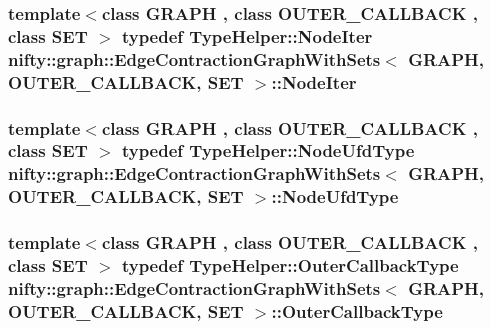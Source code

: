 \subsubsection[{Node\+Iter}]{\setlength{\rightskip}{0pt plus 5cm}template$<$class G\+R\+A\+P\+H , class O\+U\+T\+E\+R\+\_\+\+C\+A\+L\+L\+B\+A\+C\+K , class S\+E\+T $>$ typedef {\bf Type\+Helper\+::\+Node\+Iter} {\bf nifty\+::graph\+::\+Edge\+Contraction\+Graph\+With\+Sets}$<$ G\+R\+A\+P\+H, O\+U\+T\+E\+R\+\_\+\+C\+A\+L\+L\+B\+A\+C\+K, S\+E\+T $>$\+::{\bf Node\+Iter}}\label{classnifty_1_1graph_1_1EdgeContractionGraphWithSets_af9e889455b883d034bf708a0b5b05bee}
\hypertarget{classnifty_1_1graph_1_1EdgeContractionGraphWithSets_ae340ffb867bc1eb19b139e879174607e}{}
\subsubsection[{Node\+Ufd\+Type}]{\setlength{\rightskip}{0pt plus 5cm}template$<$class G\+R\+A\+P\+H , class O\+U\+T\+E\+R\+\_\+\+C\+A\+L\+L\+B\+A\+C\+K , class S\+E\+T $>$ typedef {\bf Type\+Helper\+::\+Node\+Ufd\+Type} {\bf nifty\+::graph\+::\+Edge\+Contraction\+Graph\+With\+Sets}$<$ G\+R\+A\+P\+H, O\+U\+T\+E\+R\+\_\+\+C\+A\+L\+L\+B\+A\+C\+K, S\+E\+T $>$\+::{\bf Node\+Ufd\+Type}}\label{classnifty_1_1graph_1_1EdgeContractionGraphWithSets_ae340ffb867bc1eb19b139e879174607e}
\hypertarget{classnifty_1_1graph_1_1EdgeContractionGraphWithSets_a2f741cfabfa1fb4c5bfc75df557c1d12}{}
\subsubsection[{Outer\+Callback\+Type}]{\setlength{\rightskip}{0pt plus 5cm}template$<$class G\+R\+A\+P\+H , class O\+U\+T\+E\+R\+\_\+\+C\+A\+L\+L\+B\+A\+C\+K , class S\+E\+T $>$ typedef {\bf Type\+Helper\+::\+Outer\+Callback\+Type} {\bf nifty\+::graph\+::\+Edge\+Contraction\+Graph\+With\+Sets}$<$ G\+R\+A\+P\+H, O\+U\+T\+E\+R\+\_\+\+C\+A\+L\+L\+B\+A\+C\+K, S\+E\+T $>$\+::{\bf Outer\+Callback\+Type}}\label{classnifty_1_1graph_1_1EdgeContractionGraphWithSets_a2f741cfabfa1fb4c5bfc75df557c1d12}
\hypertarget{classnifty_1_1graph_1_1EdgeContractionGraphWithSets_aeb3c8839879c1e126ceaca6bdfdff008}{}
